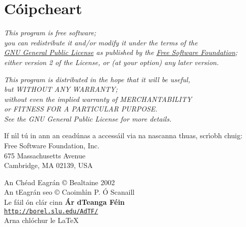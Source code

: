

\newpage
\chapter*{C\'oipcheart} 

\begin{center}
\textit{This program is free software; \\
you can redistribute it and/or modify it under the terms of the \\
\href{http://www.gnu.org/licenses/gpl.html}{GNU General Public License}
as published by the
\href{http://www.gnu.org/fsf/fsf.html}{Free Software Foundation}; \\
either version 2 of the License, or
(at your option) any later version.}
\vspace{3ex}

\textit{This program is distributed in the hope that it will be useful, \\
but WITHOUT ANY WARRANTY; \\
without even the implied warranty of
MERCHANTABILITY\\ or FITNESS FOR A PARTICULAR PURPOSE. \\
See the GNU General Public License for more details.}
\vspace{5ex}

If n\'{\i}l t\'u in ann an cead\'unas a access\'ail via na nascanna thuas,
scr\'{\i}obh chuig:\\
\vspace{2ex}
Free Software Foundation, Inc.\\
675 Massachusetts Avenue\\
Cambridge, MA 02139, USA
\vspace{7ex}

An Ch\'ead Eagr\'an \copyright \hspace{0.6ex} Bealtaine 2002 \\
\vspace{1ex}
An tEagr\'an seo 
\copyright \hspace{0.6ex} Caoimh\'{\i}n P. \'O Scanaill \the\year \\
\vspace{6ex}
{\LARGE Le f\'ail \'on cl\'ar cinn {\bf \'Ar dTeanga F\'ein}} \\
\vspace{1.5ex}
\href{http://borel.slu.edu/AdTF/index-en.html}{\large\tt http://borel.slu.edu/AdTF/} \\
\vspace{18ex}
{\small Arna chl\'ochur le \LaTeX}
\end{center}


